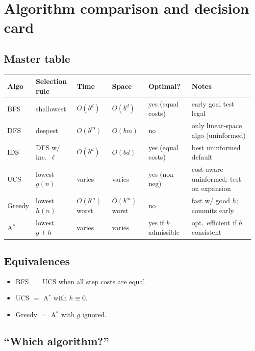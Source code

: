 \documentclass[11pt, a4paper]{article}
\newcommand{\thead}[1]{\textbf{#1}}
\begin{document}
\section{Algorithm comparison and decision card}

\subsection{Master table}

\begin{center}
\renewcommand{\arraystretch}{1.2}
\begin{tabularx}{\textwidth}{@{}p{1.4cm}p{2.6cm}p{1.6cm}p{1.6cm}p{1.6cm}X@{}}
\toprule
\thead{Algo} & \thead{Selection rule} & \thead{Time} & \thead{Space} & \thead{Optimal?} & \thead{Notes} \\
\midrule
BFS & shallowest & $O(b^d)$ & $O(b^d)$ & yes (equal costs) & early goal test legal \\
DFS & deepest & $O(b^m)$ & $O(bm)$ & no & only linear-space algo (uninformed) \\
IDS & DFS w/ inc.\ $\ell$ & $O(b^d)$ & $O(bd)$ & yes (equal costs) & best uninformed default \\
UCS & lowest $g(n)$ & varies & varies & yes (non-neg) & cost-aware uninformed; test on expansion \\
Greedy & lowest $h(n)$ & $O(b^m)$ worst & $O(b^m)$ worst & no & fast w/ good $h$; commits early \\
A$^{*}$ & lowest $g{+}h$ & varies & varies & yes if $h$ admissible & opt.\ efficient if $h$ consistent \\
\bottomrule
\end{tabularx}
\end{center}

\subsection{Equivalences}

\begin{itemize}
  \item BFS $=$ UCS when all step costs are equal.
  \item UCS $=$ A$^{*}$ with $h \equiv 0$.
  \item Greedy $=$ A$^{*}$ with $g$ ignored.
\end{itemize}

\subsection{``Which algorithm?''}
\end{document}
